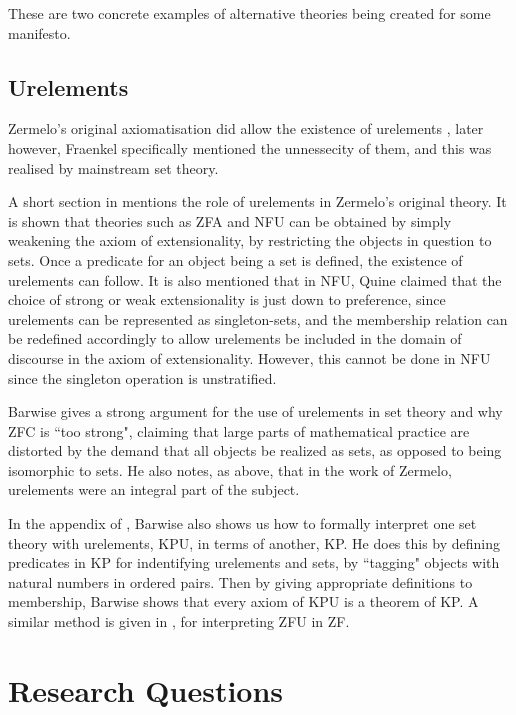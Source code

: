 \documentclass[12pt]{article}
\theoremstyle{definition}
\begin{document}
These are two concrete examples of alternative theories being created for some manifesto.
\subsection{Urelements}
Zermelo's original axiomatisation did allow the existence of urelements \cite{zermelo}, later however, Fraenkel specifically mentioned the unnessecity of them, and this was realised by mainstream set theory.

A short section in \cite{ast} mentions the role of urelements in Zermelo's original theory. It is shown that theories such as ZFA and NFU can be obtained by simply weakening the axiom of extensionality, by restricting the objects in question to sets. Once a predicate for an object being a set is defined, the existence of urelements can follow. It is also mentioned that in NFU, Quine claimed that the choice of strong or weak extensionality is just down to preference, since urelements can be represented as singleton-sets, and the membership relation can be redefined accordingly to allow urelements be included in the domain of discourse in the axiom of extensionality. However, this cannot be done in NFU since the singleton operation is unstratified.

Barwise \cite{barwise} gives a strong argument for the use of urelements in set theory and why ZFC is ``too strong", claiming that large parts of mathematical practice are distorted by the demand that all objects be realized as sets, as opposed to being isomorphic to sets. He also notes, as above, that in the work of Zermelo, urelements were an integral part of the subject.

In the appendix of \cite{barwise}, Barwise also shows us how to formally interpret one set theory with urelements, KPU, in terms of another, KP. He does this by defining predicates in KP for indentifying urelements and sets, by ``tagging" objects with natural numbers in ordered pairs. %
Then by giving appropriate definitions to membership, Barwise shows that every axiom of KPU is a theorem of KP. A similar method is given in \cite{lowe}, for interpreting ZFU in ZF.

\section{Research Questions}

\end{document}
